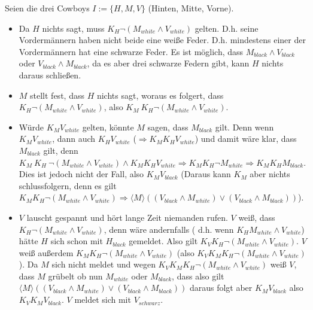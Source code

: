 \documentclass[11pt,a4paper]{paper}
\begin{document}
Seien die drei Cowboys $I:=\{H,M,V\}$ (Hinten, Mitte, Vorne).
\begin{itemize}
    \item Da $H$ nichts sagt, muss $K_H\neg(M_{white} \wedge V_{white})$ gelten. D.h. seine Vordermännern haben nicht beide eine weiße Feder. D.h. mindestens einer der Vordermännern hat eine schwarze Feder. Es ist möglich, dass $M_{black} \wedge V_{black}$ oder $V_{black} \wedge M_{black}$, da es aber drei schwarze Federn gibt, kann $H$ nichts daraus schließen.
    \item $M$ stellt fest, dass $H$ nichts sagt, woraus es folgert, dass $K_H\neg(M_{white} \wedge V_{white})$, also $K_M\ K_H\neg(M_{white} \wedge V_{white})$.
    \item Würde $K_{M} V_{white}$ gelten, könnte $M$ sagen, dass $M_{black}$ gilt. Denn wenn $K_{M} V_{white}$, dann auch $K_H V_{white}$ ($\Rightarrow K_M K_H V_{white}$) und damit wäre klar, dass $M_{black}$ gilt, denn $K_M\ K_H\ \neg(M_{white} \wedge V_{white}) \wedge K_M K_H V_{white} \Rightarrow K_M K_H \neg M_{white} \Rightarrow K_M K_H M_{black}$. Dies ist jedoch nicht der Fall, also $K_{M} V_{black}$ (Daraus kann $K_M$ aber nichts schlussfolgern, denn es gilt $K_M K_H \neg(M_{white} \wedge V_{white}) \Rightarrow \langle M \rangle ((V_{black} \wedge M_{white}) \vee (V_{black} \wedge M_{black}))$).
    \item $V$ lauscht gespannt und hört lange Zeit niemanden rufen. $V$ weiß, dass $K_H\neg(M_{white} \wedge V_{white})$, denn wäre andernfalls ( d.h. wenn $K_H M_{white} \wedge V_{white}$) hätte $H$ sich schon mit $H_{black}$ gemeldet. Also gilt $K_V K_H\neg(M_{white} \wedge V_{white})$. $V$ weiß außerdem $K_M K_H\neg(M_{white} \wedge V_{white})$ (also $K_V K_M K_H\neg(M_{white} \wedge V_{white})$). Da $M$ sich nicht meldet und wegen $K_V K_M K_H\neg(M_{white} \wedge V_{white})$ weiß $V$, dass $M$ grübelt ob nun $M_{white}$ oder $M_{black}$, dass also gilt $\langle M \rangle ((V_{black} \wedge M_{white}) \vee (V_{black} \wedge M_{black}))$ daraus folgt aber $K_M V_{black}$ also $K_V K_M V_{black}$. $V$ meldet sich mit $V_{schwarz}$.
\end{itemize}
\end{document}
